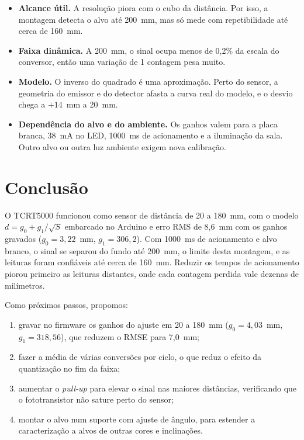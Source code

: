 \documentclass[11pt,a4paper]{article}
\begin{document}
\begin{itemize}
  \item \textbf{Alcance útil.} A resolução piora com o cubo da distância. Por isso, a montagem detecta o alvo até 200~mm, mas só mede com repetibilidade até cerca de 160~mm.
  \item \textbf{Faixa dinâmica.} A 200~mm, o sinal ocupa menos de 0,2\% da escala do conversor, então uma variação de 1 contagem pesa muito.
  \item \textbf{Modelo.} O inverso do quadrado é uma aproximação. Perto do sensor, a geometria do emissor e do detector afasta a curva real do modelo, e o desvio chega a $+14$~mm a 20~mm.
  \item \textbf{Dependência do alvo e do ambiente.} Os ganhos valem para a placa branca, 38~mA no LED, 1000~ms de acionamento e a iluminação da sala. Outro alvo ou outra luz ambiente exigem nova calibração.
\end{itemize}

\section{Conclusão}

O TCRT5000 funcionou como sensor de distância de 20 a 180~mm, com o modelo $d = g_0 + g_1/\sqrt{S}$ embarcado no Arduino e erro RMS de 8,6~mm com os ganhos gravados ($g_0 = 3{,}22$~mm, $g_1 = 306{,}2$). Com 1000~ms de acionamento e alvo branco, o sinal se separou do fundo até 200~mm, o limite desta montagem, e as leituras foram confiáveis até cerca de 160~mm. Reduzir os tempos de acionamento piorou primeiro as leituras distantes, onde cada contagem perdida vale dezenas de milímetros.

Como próximos passos, propomos:
\begin{enumerate}
  \item gravar no firmware os ganhos do ajuste em 20 a 180~mm ($g_0 = 4{,}03$~mm, $g_1 = 318{,}56$), que reduzem o RMSE para 7,0~mm;
  \item fazer a média de várias conversões por ciclo, o que reduz o efeito da quantização no fim da faixa;
  \item aumentar o \emph{pull-up} para elevar o sinal nas maiores distâncias, verificando que o fototransistor não sature perto do sensor;
  \item montar o alvo num suporte com ajuste de ângulo, para estender a caracterização a alvos de outras cores e inclinações.
\end{enumerate}
\end{document}
